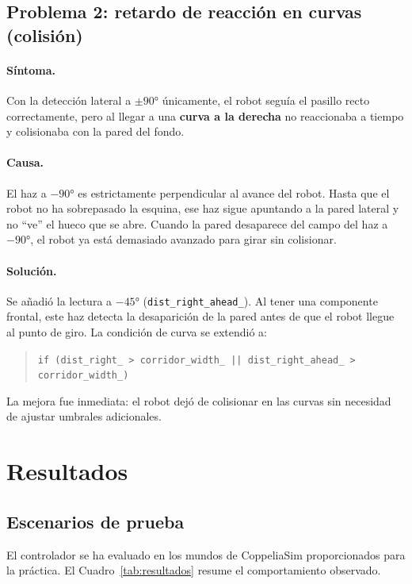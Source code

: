 \documentclass[12pt]{article}
\begin{document}
\subsection{Problema 2: retardo de reacción en curvas (colisión)}

\paragraph{Síntoma.}
Con la detección lateral a $\pm 90°$ únicamente, el robot seguía el pasillo recto correctamente, pero al llegar a una \textbf{curva a la derecha} no reaccionaba a tiempo y colisionaba con la pared del fondo.

\paragraph{Causa.}
El haz a $-90°$ es estrictamente perpendicular al avance del robot. Hasta que el robot no ha sobrepasado la esquina, ese haz sigue apuntando a la pared lateral y no ``ve'' el hueco que se abre. Cuando la pared desaparece del campo del haz a $-90°$, el robot ya está demasiado avanzado para girar sin colisionar.

\paragraph{Solución.}
Se añadió la lectura a \textbf{$-45°$} (\texttt{dist\_right\_ahead\_}). Al tener una componente frontal, este haz detecta la desaparición de la pared antes de que el robot llegue al punto de giro. La condición de curva se extendió a:

\begin{quote}
\texttt{if (dist\_right\_ > corridor\_width\_ || dist\_right\_ahead\_ > corridor\_width\_)}
\end{quote}

La mejora fue inmediata: el robot dejó de colisionar en las curvas sin necesidad de ajustar umbrales adicionales.

\section{Resultados}

\subsection{Escenarios de prueba}
El controlador se ha evaluado en los mundos de CoppeliaSim proporcionados para la práctica. El Cuadro~\ref{tab:resultados} resume el comportamiento observado.
\end{document}
